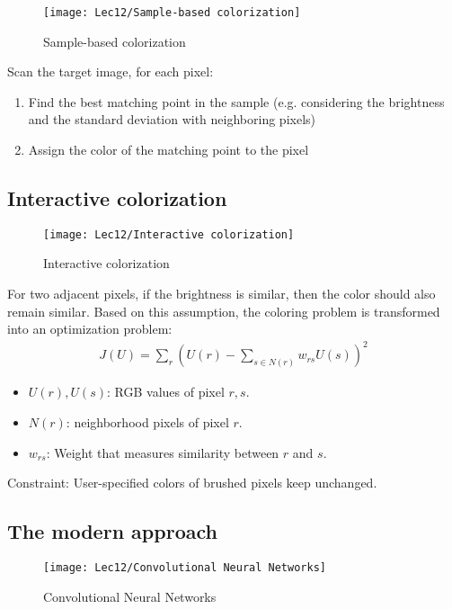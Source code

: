 \begin{figure}[H]
    \centering
    \texttt{[image: Lec12/Sample-based colorization]}
    \caption{Sample-based colorization}
\end{figure}

Scan the target image, for each pixel:
\begin{enumerate}
    \item Find the best matching point in the sample (e.g. considering the brightness and the standard deviation with neighboring pixels)
    \item Assign the color of the matching point to the pixel
\end{enumerate}

\subsection{Interactive colorization}

\begin{figure}[H]
    \centering
    \texttt{[image: Lec12/Interactive colorization]}
    \caption{Interactive colorization}
\end{figure}

For two adjacent pixels, if the brightness is similar, then the
color should also remain similar. Based on this assumption, the coloring problem is transformed into an optimization problem:
\begin{align*}
    J(U)=\sum_r \left( U(r)-\sum_{s\in N(r)}w_{rs}U(s) \right)^2
\end{align*}

\begin{itemize}
    \item $U(r), U(s)$: RGB values of pixel $r, s$. 
    \item $N(r)$: neighborhood pixels of pixel $r$.  
    \item $w_{rs}$: Weight that measures similarity between $r$ and $s$. 
\end{itemize}

Constraint: User-specified colors of brushed pixels keep unchanged. 

\subsection{The modern approach}
\begin{figure}[H]
    \centering
    \texttt{[image: Lec12/Convolutional Neural Networks]}
    \caption{Convolutional Neural Networks}
\end{figure}

